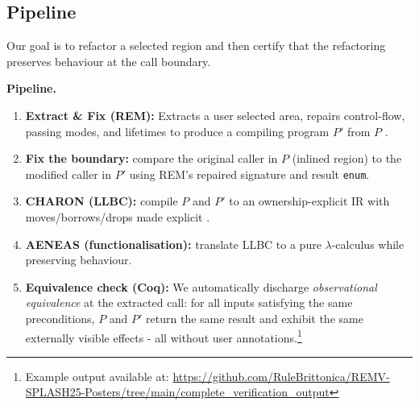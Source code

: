 \documentclass[format=sigplan,screen,10pt]{acmart}
\begin{document}
\vspace{-0.5\baselineskip}
\subsection*{Pipeline}
Our goal is to refactor a selected region and then certify that the refactoring preserves behaviour at the call boundary.

\noindent
\noindent\textbf{Pipeline.}
\begin{enumerate}[leftmargin=*,nosep]
  \item \textbf{Extract \& Fix (REM):} Extracts a user selected area, repairs control-flow, passing modes, and lifetimes to produce a compiling program $P'$ from $P$ \citep{AdventureOfALifetime}.
  \item \textbf{Fix the boundary:} compare the original caller in $P$ (inlined region) to the modified caller in $P'$ using REM’s repaired signature and result \texttt{enum}.
  \item \textbf{CHARON (LLBC):} compile $P$ and $P'$ to an ownership-explicit IR with moves/borrows/drops made explicit \citep{AENEAS_PART_2,AENEAS}.
  \item \textbf{AENEAS (functionalisation):} translate LLBC to a pure $\lambda$-calculus while preserving behaviour.
  \item \textbf{Equivalence check (Coq):} We automatically discharge \emph{observational equivalence} at the extracted call: for all inputs satisfying the same preconditions, $P$ and $P'$ return the same result and exhibit the same externally visible effects - all without user annotations.\footnote{Example output available at: \url{https://github.com/RuleBrittonica/REMV-SPLASH25-Posters/tree/main/complete_verification_output}}
\end{enumerate}
\end{document}
